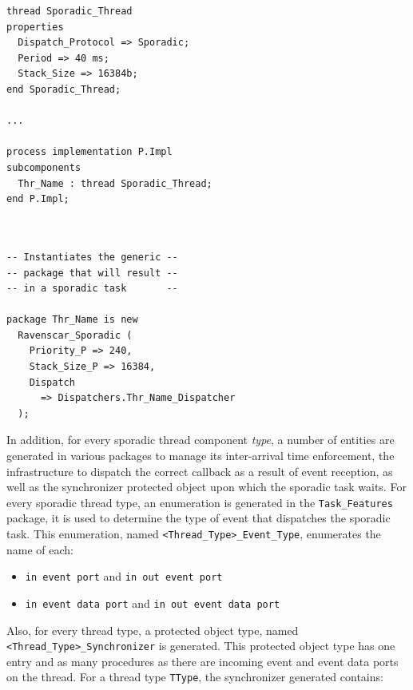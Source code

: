 \begin{minipage}{0.45\linewidth}
\lstset{language=aadl}
\begin{lstlisting}[label=lst:sporadic_aadl, caption=AADL sporadic
    thread.]
thread Sporadic_Thread
properties
  Dispatch_Protocol => Sporadic;
  Period => 40 ms;
  Stack_Size => 16384b;
end Sporadic_Thread;

...

process implementation P.Impl
subcomponents
  Thr_Name : thread Sporadic_Thread;
end P.Impl;
\end{lstlisting}
\end{minipage}
\hspace{5mm}
\begin{minipage}{0.45\linewidth}
\lstset{language=ada}
\begin{lstlisting}[label=lst:sporadic_instantiation, caption=Thread transformed to Ada task.]


-- Instantiates the generic --
-- package that will result --
-- in a sporadic task       --

package Thr_Name is new
  Ravenscar_Sporadic (
    Priority_P => 240, 
    Stack_Size_P => 16384,
    Dispatch
      => Dispatchers.Thr_Name_Dispatcher
  );
\end{lstlisting}
\end{minipage}

In addition, for every sporadic thread component \emph{type}, a
number of entities are generated in various packages to manage its
inter-arrival time enforcement, the infrastructure to dispatch the
correct callback as a result of event reception, as well as the
synchronizer protected object upon which the sporadic task waits. For
every sporadic thread type, an enumeration is generated in the
\texttt{Task\_Features} package, it is used to determine the type of
event that dispatches the sporadic task. This enumeration, named
\texttt{<Thread\_Type>\_Event\_Type}, enumerates the name of each:

\begin{itemize}
\item{\texttt{in event port} and \texttt{in out event port}}
\item{\texttt{in event data port} and \texttt{in out event data port}}
\end{itemize}

Also, for every thread type, a protected object type, named
\texttt{<Thread\_Type>\_Synchronizer} is generated. This protected
object type has one entry and as many procedures as there are incoming
event and event data ports on the thread. For a thread type
\texttt{TType}, the synchronizer generated contains:

